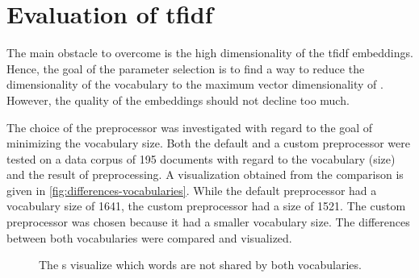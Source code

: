 \section{Evaluation of \acs{tfidf}}\label{sec:evaluation-tfidf}

The main obstacle to overcome is the high dimensionality of the \ac{tfidf} embeddings.
Hence, the goal of the parameter selection is to find a way to reduce the dimensionality of the vocabulary to the maximum vector dimensionality of \databaseName{}.
However, the quality of the embeddings should not decline too much.

The choice of the preprocessor was investigated with regard to the goal of minimizing the vocabulary size.
Both the default and a custom preprocessor were tested on a data corpus of 195 documents with regard to the vocabulary (size) and the result of preprocessing.
A visualization obtained from the comparison is given in \autoref{fig:differences-vocabularies}.
While the default preprocessor had a vocabulary size of 1641, the custom preprocessor had a size of 1521.
The custom preprocessor was chosen because it had a smaller vocabulary size.
The differences between both vocabularies were compared and visualized.

\begin{figure}%
    \centering
    \qquad
    \caption[\wordcloud{}s for different \ac{tfidf} preprocessors]{The \wordcloud{}s visualize which words are not shared by both vocabularies.}%
    \label{fig:differences-vocabularies}%
\end{figure}


